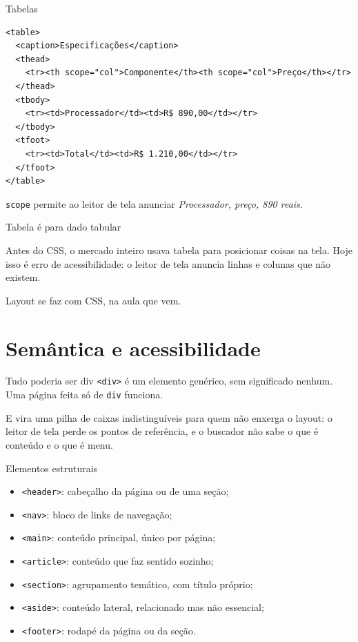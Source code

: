 \documentclass{beamer}
\begin{document}
\begin{frame}[fragile]{Tabelas}
  \begin{verbatim}
<table>
  <caption>Especificações</caption>
  <thead>
    <tr><th scope="col">Componente</th><th scope="col">Preço</th></tr>
  </thead>
  <tbody>
    <tr><td>Processador</td><td>R$ 890,00</td></tr>
  </tbody>
  <tfoot>
    <tr><td>Total</td><td>R$ 1.210,00</td></tr>
  </tfoot>
</table>
  \end{verbatim}

  \vspace{0.2cm}
  \small \texttt{scope} permite ao leitor de tela anunciar
  \textit{Processador, preço, 890 reais}.
\end{frame}

\begin{frame}{Tabela é para dado tabular}
  \begin{alertblock}{}
    Antes do CSS, o mercado inteiro usava tabela para posicionar coisas na tela.
    Hoje isso é erro de acessibilidade: o leitor de tela anuncia linhas e colunas
    que não existem.
  \end{alertblock}

  \vspace{0.5cm}
  Layout se faz com CSS, na aula que vem.
\end{frame}

\section{Semântica e acessibilidade}

\begin{frame}{Tudo poderia ser div}
  \texttt{<div>} é um elemento genérico, sem significado nenhum. Uma página feita
  só de \texttt{div} funciona.

  \vspace{0.5cm}
  E vira uma pilha de caixas indistinguíveis para quem não enxerga o layout: o
  leitor de tela perde os pontos de referência, e o buscador não sabe o que é
  conteúdo e o que é menu.
\end{frame}

\begin{frame}{Elementos estruturais}
  \begin{itemize}
    \item \texttt{<header>}: cabeçalho da página ou de uma seção;
    \item \texttt{<nav>}: bloco de links de navegação;
    \item \texttt{<main>}: conteúdo principal, único por página;
    \item \texttt{<article>}: conteúdo que faz sentido sozinho;
    \item \texttt{<section>}: agrupamento temático, com título próprio;
    \item \texttt{<aside>}: conteúdo lateral, relacionado mas não essencial;
    \item \texttt{<footer>}: rodapé da página ou da seção.
  \end{itemize}
\end{frame}
\end{document}
